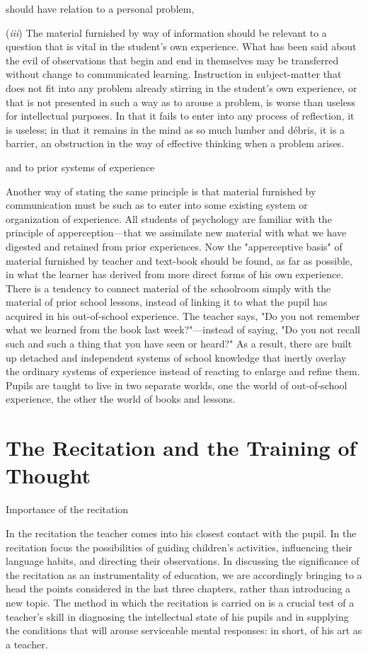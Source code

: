 \documentclass[letterpaper]{book}
\begin{document}
should have relation to a personal problem,

(\emph{iii}) The material furnished by way of information should be
relevant to a question that is vital in the student's own experience.
What has been said about the evil of observations that begin and end in
themselves may be transferred without change to communicated learning.
Instruction in subject-matter that does not fit into any problem already
stirring in the student's own experience, or that is not presented in
such a way as to arouse a problem, is worse than useless for
intellectual purposes. In that it fails to enter into any process of
reflection, it is useless; in that it remains in the mind as so much
lumber and débris, it is a barrier, an obstruction in the way of
effective thinking when a problem arises.

and to prior systems of experience

Another way of stating the same principle is that material furnished by
communication must be such as to enter into some existing system or
organization of experience. All students of psychology are familiar with
the principle of apperception---that we assimilate new material with
what we have digested and retained from prior experiences. Now the
"apperceptive basis" of material furnished by teacher and text-book
should be found, as far as possible, in what the learner has derived
from more direct forms of his own experience. There is a tendency to
connect material of the schoolroom simply with the material of prior
school lessons, instead of linking it to what the pupil has acquired in
his out-of-school experience. The teacher says, "Do you not remember
what we learned from the book last week?"---instead of saying, "Do you
not recall such and such a thing that you have seen or heard?" As a
result, there are built up detached and independent systems of school
knowledge that inertly overlay
the
ordinary systems of experience instead of reacting to enlarge and refine
them. Pupils are taught to live in two separate worlds, one the world of
out-of-school experience, the other the world of books and
lessons.

\chapter{The Recitation and the Training of Thought}

Importance of the recitation

In the recitation the teacher comes into his closest contact with the
pupil. In the recitation focus the possibilities of guiding children's
activities, influencing their language habits, and directing their
observations. In discussing the significance of the recitation as an
instrumentality of education, we are accordingly bringing to a head the
points considered in the last three chapters, rather than introducing a
new topic. The method in which the recitation is carried on is a crucial
test of a teacher's skill in diagnosing the intellectual state of his
pupils and in supplying the conditions that will arouse serviceable
mental responses: in short, of his art as a teacher.
\end{document}

